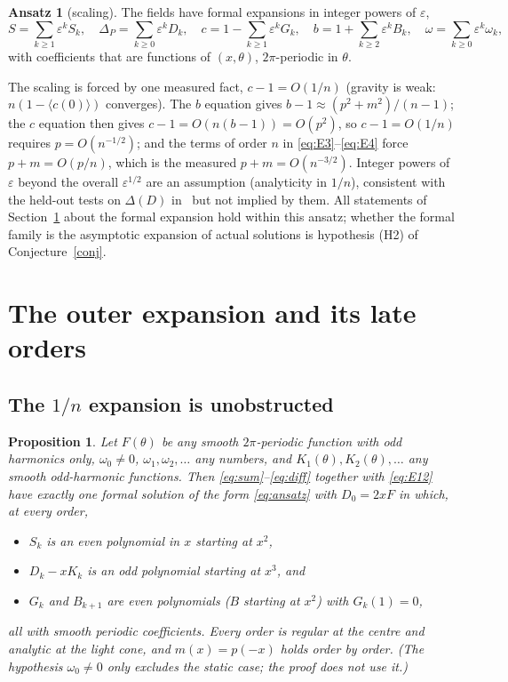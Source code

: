 \documentclass{amsart}
\numberwithin{equation}{section}
\theoremstyle{plain}
\newtheorem{proposition}{Proposition}
\theoremstyle{definition}
\newtheorem{ansatz}[definition]{Ansatz}
\theoremstyle{remark}
\newcommand{\eps}{\varepsilon}
\begin{document}
\begin{ansatz}[scaling]\label{ans:scaling}
The fields have formal expansions in integer powers of $\eps$,
\begin{equation}\label{eq:ansatz}
S = \sum_{k\ge1}\eps^k S_k,\quad \Delta_P = \sum_{k\ge0}\eps^k D_k,\quad c = 1 - \sum_{k\ge1}\eps^k G_k,\quad
b = 1 + \sum_{k\ge2}\eps^k B_k,\quad \omega = \sum_{k\ge0}\eps^k\omega_k ,
\end{equation}
with coefficients that are functions of $(x, \theta)$, $2\pi$-periodic in $\theta$.
\end{ansatz}

The scaling is forced by one measured fact, $c - 1 = O(1/n)$ (gravity is weak: $n(1 - \langle c(0)\rangle)$ converges).
The $b$ equation gives $b - 1 \approx (p^2+m^2)/(n-1)$; the $c$ equation then gives $c - 1 = O(n(b-1)) = O(p^2)$, so
$c - 1 = O(1/n)$ requires $p = O(n^{-1/2})$; and the terms of order $n$ in \eqref{eq:E3}--\eqref{eq:E4} force
$p + m = O(p/n)$, which is the measured $p + m = O(n^{-3/2})$. Integer powers of $\eps$ beyond the overall $\eps^{1/2}$
are an assumption (analyticity in $1/n$), consistent with the held-out tests on $\Delta(D)$ in~\cite{companion} but not
implied by them. All statements of Section~\ref{sec:outer} about the formal expansion hold within this ansatz; whether the
formal family is the asymptotic expansion of actual solutions is hypothesis (H2) of Conjecture~\ref{conj}.

\section{The outer expansion and its late orders}
\label{sec:outer}

\subsection{The \texorpdfstring{$1/n$}{1/n} expansion is unobstructed}

\begin{proposition}\label{prop:1}
Let $F(\theta)$ be any smooth $2\pi$-periodic function with odd harmonics only, $\omega_0 \neq 0$, $\omega_1, \omega_2,
\dots$ any numbers, and $K_1(\theta), K_2(\theta), \dots$ any smooth odd-harmonic functions. Then
\eqref{eq:sum}--\eqref{eq:diff} together with \eqref{eq:E12} have exactly one formal solution of the form
\eqref{eq:ansatz} with $D_0 = 2xF$ in which, at every order,
\begin{itemize}
\item $S_k$ is an even polynomial in $x$ starting at $x^2$,
\item $D_k - xK_k$ is an odd polynomial starting at $x^3$, and
\item $G_k$ and $B_{k+1}$ are even polynomials ($B$ starting at $x^2$) with $G_k(1) = 0$,
\end{itemize}
all with smooth periodic coefficients. Every order is regular at the centre and analytic at the light cone, and
$m(x) = p(-x)$ holds order by order. (The hypothesis $\omega_0 \ne 0$ only excludes the static case; the proof does not
use it.)
\end{proposition}
\end{document}
